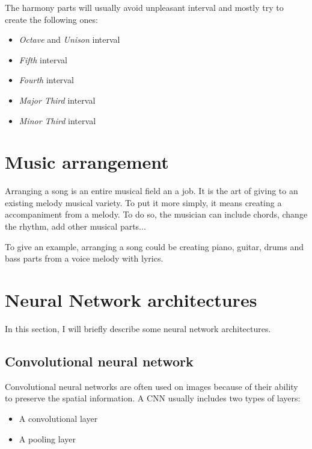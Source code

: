 \documentclass[12pt]{report}
\begin{document}
The harmony parts will usually avoid unpleasant interval and mostly try to create the following ones: 
\begin{itemize}
    \item \textit{Octave} and \textit{Unison} interval
    \item \textit{Fifth} interval
    \item \textit{Fourth} interval
    \item \textit{Major Third} interval
    \item \textit{Minor Third} interval
\end{itemize}



\section{Music arrangement}
\label{sec:back:music-arrangement}

Arranging a song is an entire musical field an a job.
It is the art of giving to an existing melody musical variety.
To put it more simply, it means creating a accompaniment from a melody.
To do so, the musician can include chords, change the rhythm, add other musical parts...

To give an example, arranging a song could be creating piano, guitar, drums and bass parts from a voice melody with lyrics.



\section{Neural Network architectures}
\label{sec:back:nn-architectures}

In this section, I will briefly describe some neural network architectures.

\subsection{Convolutional neural network}

Convolutional neural networks are often used on images because of their ability to preserve the spatial information.
A CNN usually includes two types of layers:
\begin{itemize}
    \item A convolutional layer
    \item A pooling layer
\end{itemize}
\end{document}
